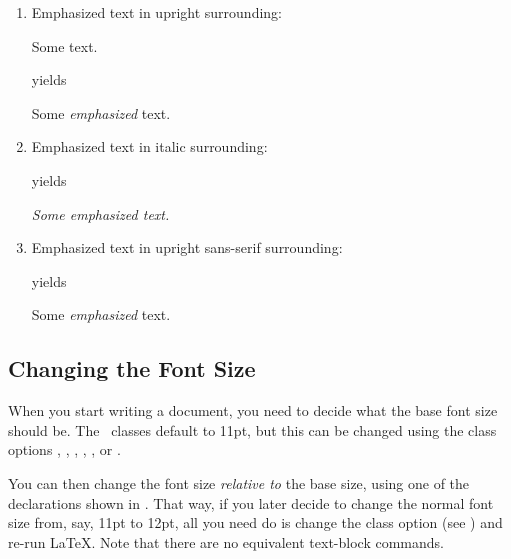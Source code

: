 \begin{enumerate}
\item Emphasized text in upright surrounding:
\begin{codeS}
Some  text.
\end{codeS}%
yields
\begin{resultS}
Some \emph{emphasized} text.
\end{resultS}

\item Emphasized text in italic surrounding:
\begin{codeS}
\end{codeS}%
yields
\begin{resultS}
{\itshape Some \emph{emphasized} text.}
\end{resultS}

\bookpagebreak
\item Emphasized text in upright sans-serif surrounding:
\begin{codeS}
\end{codeS}%
yields
\begin{resultS}
{\sffamily Some \emph{emphasized} text.}
\end{resultS}
\end{enumerate}

\subsection{Changing the Font Size}
\label{sec:fontsize}

When you start writing a document, you need to decide what the base
font size should be. The \koma\ classes default to 11pt, but this can
be changed using the class options \scrclsopt{8pt}, \scrclsopt{9pt},
\clsopt{10pt}, \clsopt{12pt}, \scrclsopt{14pt}, \scrclsopt{17pt} or
\scrclsopt{20pt}.

You can then change the font size \emph{relative to} the base size,
using one of the declarations shown in . That
way, if you later decide to change the normal font size from, say,
11pt to 12pt, all you need do is change the class option (see
)
and re-run \LaTeX. Note that there are no equivalent text-block
commands.

